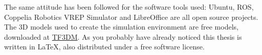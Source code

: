 The same attitude has been followed for the software tools used: Ubuntu, ROS, Coppelia Robotics VREP Simulator and LibreOffice are all open source projects. The 3D models used to create the simulation environment are free models, downloaded at \href{http://tf3dm.com/}{TF3DM}. As you probably have already noticed this thesis is written in \LaTeX, also distributed under a free software license.
